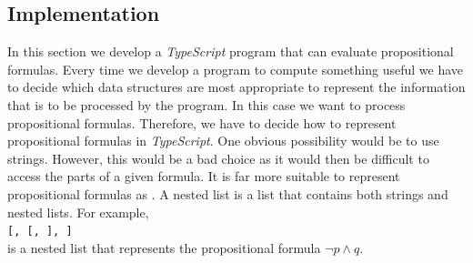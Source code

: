 \subsection{Implementation} 
In this section we develop a \textsl{TypeScript} program that can evaluate propositional formulas.
Every time we develop a program to compute something useful we have to decide which data structures are
most appropriate to represent the information that is to be processed by the program.  In this case we want to
process propositional formulas.  Therefore, we have to decide how to represent propositional formulas in
\textsl{TypeScript}.  One obvious possibility would be to use strings.  However, this would be a bad choice as it
would then be difficult to access the parts of a given formula.  It is far more suitable to represent
propositional formulas as .  A nested list is a list that contains both strings and
nested lists.  For example,
\\[0.2cm]
\hspace*{1.3cm}
\texttt{[\tsq{$\wedge$}, [\tsq{$\neg$}, ], ]}
\\[0.2cm]
is a nested list that represents the propositional formula $\neg p \wedge q$.

